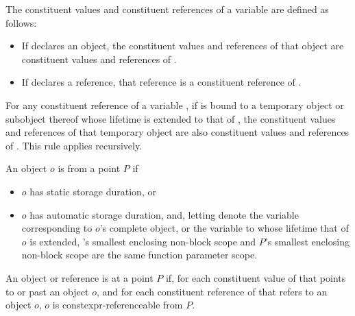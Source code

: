 \documentclass{wg21}
\begin{document}

\begin{addedblock}
The constituent values and constituent references of a variable  are defined as follows:
\begin{itemize}
\item If  declares an object, the constituent values and references of that object are
constituent values and references of .
\item If  declares a reference, that reference is a constituent reference of .
\end{itemize}
For any constituent reference  of a variable , if  is bound to a temporary object or
subobject thereof whose lifetime is extended to that of , the constituent values and
references of that temporary object are also constituent values and references of . This rule
applies recursively.
\end{addedblock}


\begin{addedblock}
An object $o$ is  from a point $P$ if
\begin{itemize}
\item $o$ has static storage duration, or
\item $o$ has automatic storage duration, and, letting  denote the variable corresponding to
$o$’s complete object, or the variable to whose lifetime that of $o$ is extended, ’s smallest
enclosing non-block scope and $P$’s smallest enclosing non-block scope are the same function parameter scope.
\end{itemize}
\end{addedblock}


\begin{addedblock}
An object or reference  is  at a point $P$ if, for each constituent value
of  that points to or past an object $o$, and for each constituent reference of  that refers to an
object $o$, $o$ is constexpr-referenceable from $P$.
\end{addedblock}

\end{document}
